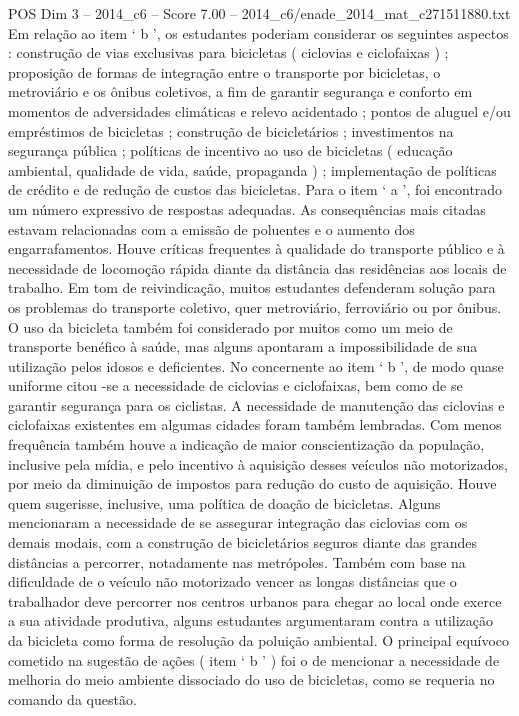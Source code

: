 \begin{textsample}{POS Dim 3 – 2014\_c6 – Score 7.00 – 2014\_c6/enade\_2014\_mat\_c271511880.txt}
Em relação ao item ‘ b ’, os estudantes poderiam considerar os seguintes aspectos : construção de vias exclusivas para bicicletas ( ciclovias e ciclofaixas ) ; proposição de formas de integração entre o transporte por bicicletas, o metroviário e os ônibus coletivos, a fim de garantir segurança e conforto em momentos de adversidades climáticas e relevo acidentado ; pontos de aluguel e/ou empréstimos de bicicletas ; construção de bicicletários ; investimentos na segurança pública ; políticas de incentivo ao uso de bicicletas ( educação ambiental, qualidade de vida, saúde, propaganda ) ; implementação de políticas de crédito e de redução de custos das bicicletas.
Para o item ‘ a ’, foi encontrado um número expressivo de respostas adequadas.
As consequências mais citadas estavam relacionadas com a emissão de poluentes e o aumento dos engarrafamentos.
Houve críticas frequentes à qualidade do transporte público e à necessidade de locomoção rápida diante da distância das residências aos locais de trabalho.
Em tom de reivindicação, muitos estudantes defenderam solução para os problemas do transporte coletivo, quer metroviário, ferroviário ou por ônibus.
O uso da bicicleta também foi considerado por muitos como um meio de transporte benéfico à saúde, mas alguns apontaram a impossibilidade de sua utilização pelos idosos e deficientes.
No concernente ao item ‘ b ’, de modo quase uniforme citou -se a necessidade de ciclovias e ciclofaixas, bem como de se garantir segurança para os ciclistas.
A necessidade de manutenção das ciclovias e ciclofaixas existentes em algumas cidades foram também lembradas.
Com menos frequência também houve a indicação de maior conscientização da população, inclusive pela mídia, e pelo incentivo à aquisição desses veículos não motorizados, por meio da diminuição de impostos para redução do custo de aquisição.
Houve quem sugerisse, inclusive, uma política de doação de bicicletas.
Alguns mencionaram a necessidade de se assegurar integração das ciclovias com os demais modais, com a construção de bicicletários seguros diante das grandes distâncias a percorrer, notadamente nas metrópoles.
Também com base na dificuldade de o veículo não motorizado vencer as longas distâncias que o trabalhador deve percorrer nos centros urbanos para chegar ao local onde exerce a sua atividade produtiva, alguns estudantes argumentaram contra a utilização da bicicleta como forma de resolução da poluição ambiental.
O principal equívoco cometido na sugestão de ações ( item ‘ b ’ ) foi o de mencionar a necessidade de melhoria do meio ambiente dissociado do uso de bicicletas, como se requeria no comando da questão.

\end{textsample}
